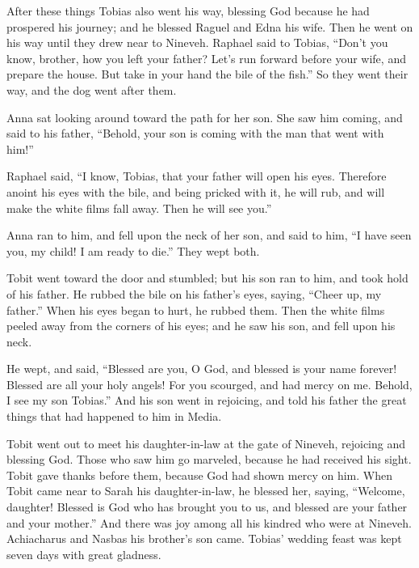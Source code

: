  After these things Tobias also went his way, blessing God
because he had prospered his journey; and he blessed Raguel and Edna his
wife. Then he went on his way until they drew near to Nineveh.
 Raphael said to Tobias, ``Don't you know, brother, how you
left your father?  Let's run forward before your wife, and
prepare the house.  But take in your hand the bile of the
fish.'' So they went their way, and the dog went after them.

 Anna sat looking around toward the path for her son.
 She saw him coming, and said to his father, ``Behold, your
son is coming with the man that went with him!''

 Raphael said, ``I know, Tobias, that your father will open
his eyes.  Therefore anoint his eyes with the bile, and
being pricked with it, he will rub, and will make the white films fall
away. Then he will see you.''

 Anna ran to him, and fell upon the neck of her son, and
said to him, ``I have seen you, my child! I am ready to die.'' They wept
both.

 Tobit went toward the door and stumbled; but his son ran
to him,  and took hold of his father. He rubbed the bile on
his father's eyes, saying, ``Cheer up, my father.''  When
his eyes began to hurt, he rubbed them.  Then the white
films peeled away from the corners of his eyes; and he saw his son, and
fell upon his neck.

 He wept, and said, ``Blessed are you, O God, and blessed
is your name forever! Blessed are all your holy angels! 
For you scourged, and had mercy on me. Behold, I see my son Tobias.''
And his son went in rejoicing, and told his father the great things that
had happened to him in Media.

 Tobit went out to meet his daughter-in-law at the gate of
Nineveh, rejoicing and blessing God. Those who saw him go marveled,
because he had received his sight.  Tobit gave thanks
before them, because God had shown mercy on him. When Tobit came near to
Sarah his daughter-in-law, he blessed her, saying, ``Welcome, daughter!
Blessed is God who has brought you to us, and blessed are your father
and your mother.'' And there was joy among all his kindred who were at
Nineveh.  Achiacharus and Nasbas his brother's son came.
 Tobias' wedding feast was kept seven days with great
gladness.

